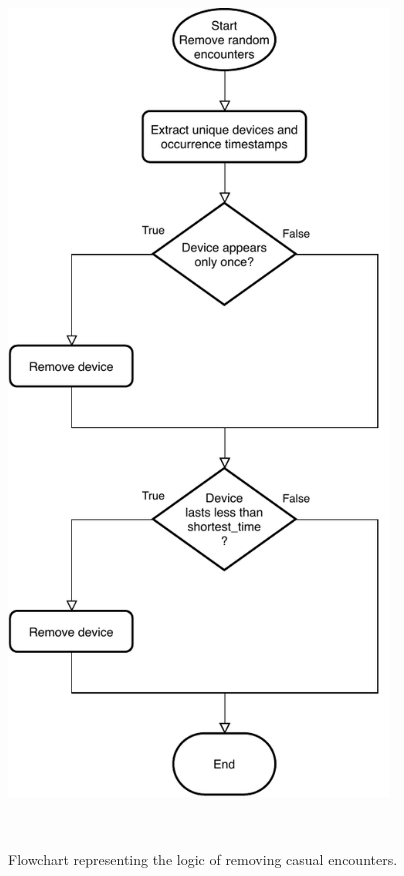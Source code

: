 \begin{figure}
\begin{minipage}[b]{8.5cm}
\centering
\includegraphics[width=0.9\textwidth]{images/flowrandom}
\caption{Flowchart representing the logic of removing casual encounters.}
\label{fig:flowrandom}
\end{minipage}
\ \hspace{2mm} \hspace{3mm} \

\end{figure}
